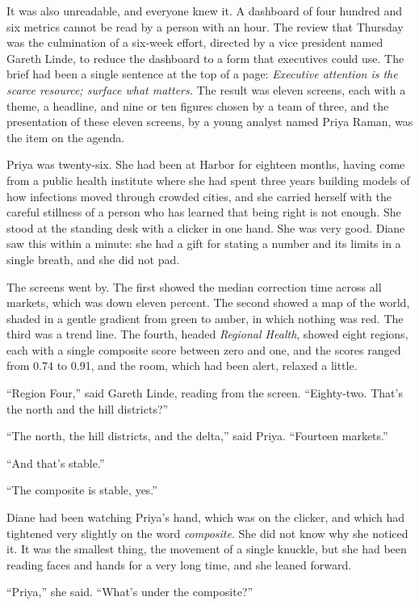 It was also unreadable, and everyone knew it. A dashboard of four hundred and six metrics cannot be read by a person with an hour. The review that Thursday was the culmination of a six-week effort, directed by a vice president named Gareth Linde, to reduce the dashboard to a form that executives could use. The brief had been a single sentence at the top of a page: \emph{Executive attention is the scarce resource; surface what matters.} The result was eleven screens, each with a theme, a headline, and nine or ten figures chosen by a team of three, and the presentation of these eleven screens, by a young analyst named Priya Raman, was the item on the agenda.

Priya was twenty-six. She had been at Harbor for eighteen months, having come from a public health institute where she had spent three years building models of how infections moved through crowded cities, and she carried herself with the careful stillness of a person who has learned that being right is not enough. She stood at the standing desk with a clicker in one hand. She was very good. Diane saw this within a minute: she had a gift for stating a number and its limits in a single breath, and she did not pad.

The screens went by. The first showed the median correction time across all markets, which was down eleven percent. The second showed a map of the world, shaded in a gentle gradient from green to amber, in which nothing was red. The third was a trend line. The fourth, headed \emph{Regional Health}, showed eight regions, each with a single composite score between zero and one, and the scores ranged from 0.74 to 0.91, and the room, which had been alert, relaxed a little.

``Region Four,'' said Gareth Linde, reading from the screen. ``Eighty-two. That's the north and the hill districts?''

``The north, the hill districts, and the delta,'' said Priya. ``Fourteen markets.''

``And that's stable.''

``The composite is stable, yes.''

Diane had been watching Priya's hand, which was on the clicker, and which had tightened very slightly on the word \emph{composite}. She did not know why she noticed it. It was the smallest thing, the movement of a single knuckle, but she had been reading faces and hands for a very long time, and she leaned forward.

``Priya,'' she said. ``What's under the composite?''

